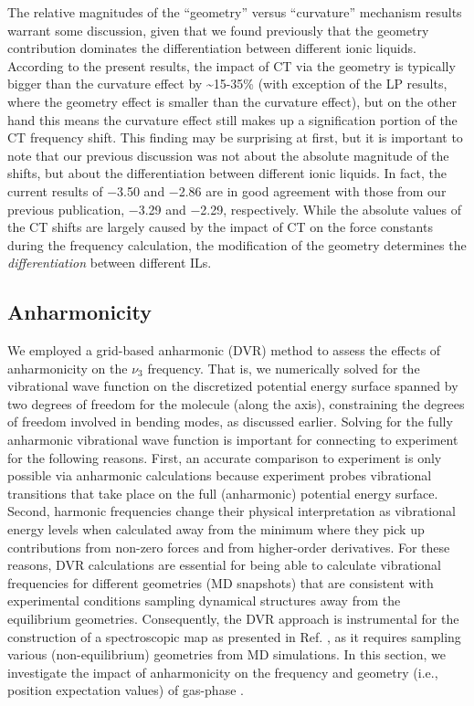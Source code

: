 The relative magnitudes of the ``geometry'' versus ``curvature'' mechanism results warrant some discussion, given that we found previously that the geometry contribution dominates the differentiation between different ionic liquids. According to the present results, the impact of CT via the geometry is typically bigger than the curvature effect by \textasciitilde{}15-35\% (with exception of the LP results, where the geometry effect is smaller than the curvature effect), but on the other hand this means the curvature effect still makes up a signification portion of the CT frequency shift. This finding may be surprising at first, but it is important to note that our previous discussion was not about the absolute magnitude of the shifts, but about the differentiation between different ionic liquids. In fact, the current results of \num{-3.50} and \SI{-2.86}{\wavenumber} are in good agreement with those from our previous publication, \SI{-3.29}{\wavenumber} and \SI{-2.29}{\wavenumber}, respectively. While the absolute values of the CT shifts are largely caused by the impact of CT on the force constants during the frequency calculation, the modification of the geometry determines the \emph{differentiation} between different ILs.

\subsection{Anharmonicity}
\label{paper_02:ssec:IIIB}

We employed a grid-based anharmonic (DVR) method to assess the effects of anharmonicity on the  \(\nu_{3}\) frequency. That is, we numerically solved for the vibrational wave function on the discretized potential energy surface spanned by two degrees of freedom for the  molecule (along the  axis), constraining the degrees of freedom involved in  bending modes, as discussed earlier. Solving for the fully anharmonic vibrational wave function is important for connecting to experiment for the following reasons. First, an accurate comparison to experiment is only possible via anharmonic calculations because experiment probes vibrational transitions that take place on the full (anharmonic) potential energy surface. Second, harmonic frequencies change their physical interpretation as vibrational energy levels when calculated away from the minimum where they pick up contributions from non-zero forces and from higher-order derivatives. For these reasons, DVR calculations are essential for being able to calculate vibrational frequencies for different geometries (MD snapshots) that are consistent with experimental conditions sampling dynamical structures away from the equilibrium geometries. Consequently, the DVR approach is instrumental for the construction of a spectroscopic map as presented in Ref. \cite{Daly2016}, as it requires sampling various (non-equilibrium) geometries from MD simulations. In this section, we investigate the impact of anharmonicity on the frequency and geometry (i.e., position expectation values) of gas-phase .

